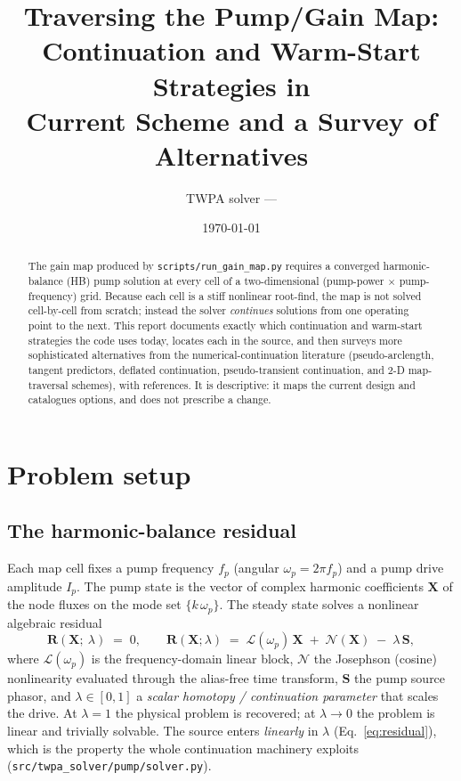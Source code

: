 \documentclass[11pt]{article}
\title{Traversing the Pump/Gain Map:\\
Continuation and Warm-Start Strategies in \code{twpa\_solver}\\
\large Current Scheme and a Survey of Alternatives}
\author{TWPA solver --- \code{twpa\_jax}}
\date{\today}
\newcommand{\code}[1]{\texttt{\small #1}}
\newcommand{\Res}{\mathbf{R}}
\newcommand{\Xv}{\mathbf{X}}
\begin{document}
\maketitle

\begin{abstract}
The gain map produced by \code{scripts/run\_gain\_map.py} requires a converged
harmonic-balance (HB) pump solution at every cell of a two-dimensional
(pump-power $\times$ pump-frequency) grid. Because each cell is a stiff
nonlinear root-find, the map is not solved cell-by-cell from scratch; instead
the solver \emph{continues} solutions from one operating point to the next.
This report documents exactly which continuation and warm-start strategies the
code uses today, locates each in the source, and then surveys more sophisticated
alternatives from the numerical-continuation literature (pseudo-arclength,
tangent predictors, deflated continuation, pseudo-transient continuation, and
2-D map-traversal schemes), with references. It is descriptive: it maps the
current design and catalogues options, and does not prescribe a change.
\end{abstract}

\tableofcontents

\section{Problem setup}

\subsection{The harmonic-balance residual}
Each map cell fixes a pump frequency $f_p$ (angular $\omega_p = 2\pi f_p$) and a
pump drive amplitude $I_p$. The pump state is the vector of complex harmonic
coefficients $\Xv$ of the node fluxes on the mode set
$\{k\,\omega_p\}$. The steady state solves a nonlinear algebraic residual
\begin{equation}
  \Res(\Xv;\ \lambda) \;=\; 0,
  \qquad
  \Res(\Xv;\lambda) \;=\; \mathcal{L}(\omega_p)\,\Xv \;+\; \mathcal{N}(\Xv) \;-\; \lambda\, \mathbf{S},
  \label{eq:residual}
\end{equation}
where $\mathcal{L}(\omega_p)$ is the frequency-domain linear block, $\mathcal{N}$
the Josephson (cosine) nonlinearity evaluated through the alias-free time
transform, $\mathbf{S}$ the pump source phasor, and
$\lambda \in [0,1]$ a \emph{scalar homotopy / continuation parameter} that
scales the drive. At $\lambda = 1$ the physical problem is recovered; at
$\lambda \to 0$ the problem is linear and trivially solvable. The source enters
\emph{linearly} in $\lambda$ (Eq.~\ref{eq:residual}), which is the property the
whole continuation machinery exploits (\code{src/twpa\_solver/pump/solver.py}).
\end{document}

